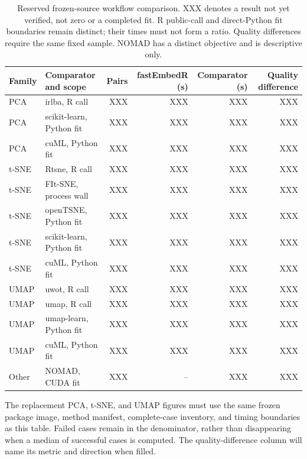 \documentclass[article]{jss}
\begin{document}
\begin{table}[htbp]
\centering
\scriptsize
\caption{Reserved frozen-source workflow comparison. XXX denotes a
  result not yet verified, not zero or a completed fit. R public-call
  and direct-Python fit boundaries remain distinct; their times must not
  form a ratio. Quality differences require the same fixed sample.
  NOMAD has a distinct objective and is descriptive only.}
\label{tab:pending-workflow}
\begin{tabular}{llrrrr}
\toprule
Family & Comparator and scope & Pairs & fastEmbedR (s) &
  Comparator (s) & Quality difference \\
\midrule
PCA & irlba, R call & XXX & XXX & XXX & XXX \\
PCA & scikit-learn, Python fit & XXX & XXX & XXX & XXX \\
PCA & cuML, Python fit & XXX & XXX & XXX & XXX \\
t-SNE & Rtsne, R call & XXX & XXX & XXX & XXX \\
t-SNE & FIt-SNE, process wall & XXX & XXX & XXX & XXX \\
t-SNE & openTSNE, Python fit & XXX & XXX & XXX & XXX \\
t-SNE & scikit-learn, Python fit & XXX & XXX & XXX & XXX \\
t-SNE & cuML, Python fit & XXX & XXX & XXX & XXX \\
UMAP & uwot, R call & XXX & XXX & XXX & XXX \\
UMAP & umap, R call & XXX & XXX & XXX & XXX \\
UMAP & umap-learn, Python fit & XXX & XXX & XXX & XXX \\
UMAP & cuML, Python fit & XXX & XXX & XXX & XXX \\
Other & NOMAD, CUDA fit & XXX & -- & XXX & XXX \\
\bottomrule
\end{tabular}
\end{table}

The replacement PCA, t-SNE, and UMAP figures must use the same frozen
package image, method manifest, complete-case inventory, and timing
boundaries as this table. Failed cases remain in the denominator, rather
than disappearing when a median of successful cases is computed. The
quality-difference column will name its metric and direction when filled.
\end{document}
